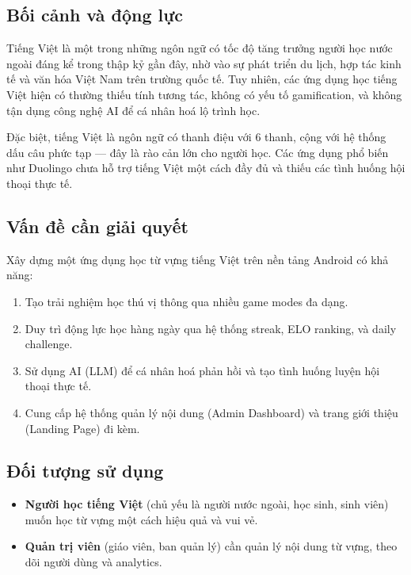 \documentclass[12pt,a4paper]{article}
\begin{document}
\subsection{Bối cảnh và động lực}

Tiếng Việt là một trong những ngôn ngữ có tốc độ tăng trưởng người học nước ngoài
đáng kể trong thập kỷ gần đây, nhờ vào sự phát triển du lịch, hợp tác kinh tế và
văn hóa Việt Nam trên trường quốc tế. Tuy nhiên, các ứng dụng học tiếng Việt hiện có
thường thiếu tính tương tác, không có yếu tố gamification, và không tận dụng
công nghệ AI để cá nhân hoá lộ trình học.

Đặc biệt, tiếng Việt là ngôn ngữ có thanh điệu với 6 thanh, cộng với hệ thống
dấu câu phức tạp — đây là rào cản lớn cho người học. Các ứng dụng phổ biến như
Duolingo chưa hỗ trợ tiếng Việt một cách đầy đủ và thiếu các tình huống hội thoại
thực tế.

\subsection{Vấn đề cần giải quyết}

\begin{tcolorbox}[colback=boxbg, colframe=vfred, title={\textbf{Bài toán chính}},
  fonttitle=\bfseries, arc=4pt]
Xây dựng một ứng dụng học từ vựng tiếng Việt trên nền tảng Android có khả năng:
\begin{enumerate}
  \item Tạo trải nghiệm học thú vị thông qua nhiều game modes đa dạng.
  \item Duy trì động lực học hàng ngày qua hệ thống streak, ELO ranking, và daily challenge.
  \item Sử dụng AI (LLM) để cá nhân hoá phản hồi và tạo tình huống luyện hội thoại thực tế.
  \item Cung cấp hệ thống quản lý nội dung (Admin Dashboard) và trang giới thiệu (Landing Page) đi kèm.
\end{enumerate}
\end{tcolorbox}

\subsection{Đối tượng sử dụng}

\begin{itemize}
  \item \textbf{Người học tiếng Việt} (chủ yếu là người nước ngoài, học sinh, sinh viên)
        muốn học từ vựng một cách hiệu quả và vui vẻ.
  \item \textbf{Quản trị viên} (giáo viên, ban quản lý) cần quản lý nội dung từ vựng,
        theo dõi người dùng và analytics.
\end{itemize}
\end{document}
